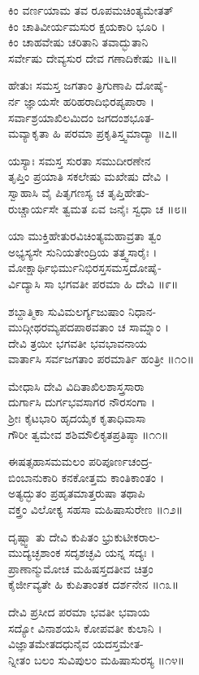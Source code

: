      ಕಿಂ ವರ್ಣಯಾಮ ತವ ರೂಪಮಚಿಂತ್ಯಮೇತತ್\\
ಕಿಂ ಚಾತಿವೀರ್ಯಮಸುರ ಕ್ಷಯಕಾರಿ ಭೂರಿ ।\\
     ಕಿಂ ಚಾಹವೇಷು ಚರಿತಾನಿ ತವಾದ್ಭುತಾನಿ\\
ಸರ್ವೇಷು ದೇವ್ಯಸುರ ದೇವ ಗಣಾದಿಕೇಷು ॥೬॥

     ಹೇತುಃ ಸಮಸ್ತ ಜಗತಾಂ ತ್ರಿಗುಣಾಪಿ ದೋಷೈ-\\
ರ್ನ ಜ್ಞಾಯಸೇ ಹರಿಹರಾದಿಭಿರಪ್ಯಪಾರಾ ।\\
     ಸರ್ವಾಶ್ರಯಾಖಿಲಮಿದಂ ಜಗದಂಶಭೂತ-\\
ಮವ್ಯಾಕೃತಾ ಹಿ ಪರಮಾ ಪ್ರಕೃತಿಸ್ತ್ವಮಾದ್ಯಾ ॥೭॥

     ಯಸ್ಯಾಃ ಸಮಸ್ತ ಸುರತಾ ಸಮುದೀರಣೇನ\\
ತೃಪ್ತಿಂ ಪ್ರಯಾತಿ ಸಕಲೇಷು ಮಖೇಷು ದೇವಿ ।\\
     ಸ್ವಾಹಾಸಿ ವೈ ಪಿತೃಗಣಸ್ಯ ಚ ತೃಪ್ತಿಹೇತು-\\
ರುಚ್ಚಾರ್ಯಸೇ ತ್ವಮತ ಏವ ಜನೈಃ ಸ್ವಧಾ ಚ ॥೮॥

     ಯಾ ಮುಕ್ತಿಹೇತುರವಿಚಿಂತ್ಯಮಹಾವ್ರತಾ ತ್ವಂ\\
ಅಭ್ಯಸ್ಯಸೇ ಸುನಿಯತೇಂದ್ರಿಯ ತತ್ತ್ವಸಾರೈಃ ।\\
     ಮೋಕ್ಷಾರ್ಥಿಭಿರ್ಮುನಿಭಿರಸ್ತಸಮಸ್ತದೋಷೈ-\\
ರ್ವಿದ್ಯಾಸಿ ಸಾ ಭಗವತೀ ಪರಮಾ ಹಿ ದೇವಿ ॥೯॥

     ಶಬ್ದಾತ್ಮಿಕಾ ಸುವಿಮಲರ್ಗ್ಯಜುಷಾಂ ನಿಧಾನ-\\
ಮುದ್ಗೀಥರಮ್ಯಪದಪಾಠವತಾಂ ಚ ಸಾಮ್ನಾಂ ।\\
     ದೇವಿ ತ್ರಯೀ ಭಗವತೀ ಭವಭಾವನಾಯ\\
ವಾರ್ತಾಸಿ ಸರ್ವಜಗತಾಂ ಪರಮಾರ್ತಿ ಹಂತ್ರೀ ॥೧೦॥

     ಮೇಧಾಸಿ ದೇವಿ ವಿದಿತಾಖಿಲಶಾಸ್ತ್ರಸಾರಾ\\
ದುರ್ಗಾಸಿ ದುರ್ಗಭವಸಾಗರ ನೌರಸಂಗಾ ।\\
     ಶ್ರೀಃ ಕೈಟಭಾರಿ ಹೃದಯೈಕ ಕೃತಾಧಿವಾಸಾ\\
ಗೌರೀ ತ್ವಮೇವ ಶಶಿಮೌಲಿಕೃತಪ್ರತಿಷ್ಠಾ ॥೧೧॥

     ಈಷತ್ಸಹಾಸಮಮಲಂ ಪರಿಪೂರ್ಣಚಂದ್ರ-\\
ಬಿಂಬಾನುಕಾರಿ ಕನಕೋತ್ತಮ ಕಾಂತಿಕಾಂತಂ ।\\
     ಅತ್ಯದ್ಭುತಂ ಪ್ರಹೃತಮಾತ್ತರುಷಾ ತಥಾಪಿ\\
ವಕ್ತ್ರಂ ವಿಲೋಕ್ಯ ಸಹಸಾ ಮಹಿಷಾಸುರೇಣ ॥೧೨॥

     ದೃಷ್ಟ್ವಾ ತು ದೇವಿ ಕುಪಿತಂ ಭ್ರುಕುಟೀಕರಾಲ-\\
ಮುದ್ಯಚ್ಛಶಾಂಕ ಸದೃಶಚ್ಛವಿ ಯನ್ನ ಸದ್ಯಃ ।\\
     ಪ್ರಾಣಾನ್ಮುಮೋಚ ಮಹಿಷಸ್ತದತೀವ ಚಿತ್ರಂ\\
ಕೈರ್ಜೀವ್ಯತೇ ಹಿ ಕುಪಿತಾಂತಕ ದರ್ಶನೇನ ॥೧೩॥

     ದೇವಿ ಪ್ರಸೀದ ಪರಮಾ ಭವತೀ ಭವಾಯ\\
ಸದ್ಯೋ ವಿನಾಶಯಸಿ ಕೋಪವತೀ ಕುಲಾನಿ ।\\
     ವಿಜ್ಞಾತಮೇತದಧುನೈವ ಯದಸ್ತಮೇತ-\\
ನ್ನೀತಂ ಬಲಂ ಸುವಿಪುಲಂ ಮಹಿಷಾಸುರಸ್ಯ ॥೧೪॥

